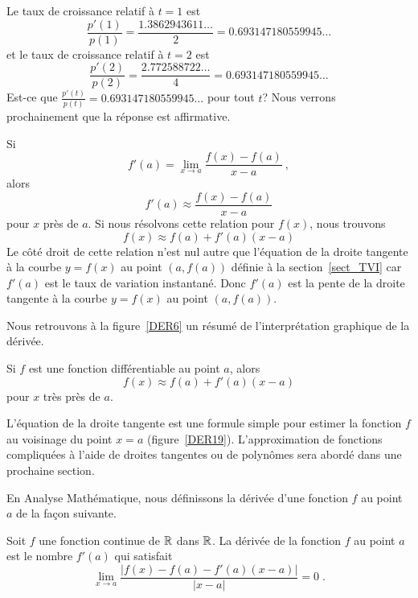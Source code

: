 {\begin{egg}
Le taux de croissance relatif à $t=1$ est
\[
\frac{p'(1)}{p(1)} = \frac{1.3862943611\ldots}{2}
= 0.693147180559945\ldots
\]
et le taux de croissance relatif à $t=2$ est
\[
\frac{p'(2)}{p(2)} = \frac{2.772588722\ldots}{4}
= 0.693147180559945\ldots
\]
Est-ce que $\displaystyle \frac{p'(t)}{p(t)} = 0.693147180559945\ldots$
pour tout $t$?  Nous verrons prochainement que la réponse est affirmative.
\end{egg}

Si
\[
f'(a) = \lim_{x\rightarrow a} \frac{f(x) - f(a)}{x-a} \ ,
\]
alors
\[
f'(a) \approx \frac{f(x) - f(a)}{x-a}
\]
pour $x$ près de $a$.  Si nous résolvons cette relation pour $f(x)$,
nous trouvons
\begin{equation} \label{faedt}
f(x) \approx f(a) + f'(a) (x-a)
\end{equation}
Le côté droit de cette relation n'est nul autre que l'équation de la
droite tangente à la courbe $y=f(x)$ au point $(a,f(a))$ définie à la
section~\ref{sect_TVI} car $f'(a)$ est le taux de variation
instantané.  Donc $f'(a)$ est la pente de la droite tangente à la
courbe $y=f(x)$ au point $(a,f(a))$.

Nous retrouvons à la figure~\ref{DER6} un résumé de l'interprétation
graphique de la dérivée.


\begin{prop} \label{der_approx_ft}
Si $f$ est une fonction différentiable au point $a$, alors
\[
f(x) \approx f(a) + f'(a) (x-a)
\]
pour $x$ très près de $a$.
\end{prop}

L'équation de la droite tangente est une formule simple pour estimer
la fonction $f$ au voisinage du point $x=a$ (figure~\ref{DER19}).
L'approximation de fonctions compliquées à l'aide
de droites tangentes ou de polynômes sera abordé dans une prochaine
section.

\begin{rmk}[\theory]
En Analyse Mathématique, nous définissons la dérivée d'une fonction $f$ au
point $a$ de la façon suivante.

\begin{defn}
Soit $f$ une fonction continue de $\mathbb{R}$ dans $\mathbb{R}$.  La dérivée de la
fonction $f$ au point $a$ est le nombre $f'(a)$ qui satisfait
\begin{equation} \label{RigDfn}
\lim_{x\rightarrow a} \frac{|f(x) - f(a) - f'(a)(x-a)|}{|x-a|} = 0 \; .
\end{equation}
\end{defn}


\end{rmk}}
